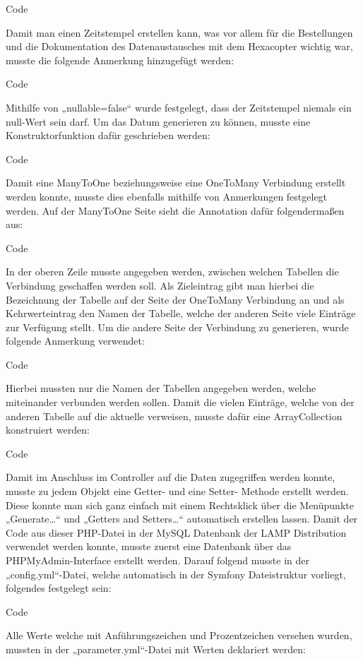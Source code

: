 	Code
	
	Damit man einen Zeitstempel erstellen kann, was vor allem für die Bestellungen und die Dokumentation des Datenaustausches mit dem Hexacopter wichtig war, musste die folgende Anmerkung hinzugefügt werden:
	
	Code
	
	Mithilfe von „nullable=false“ wurde festgelegt, dass der Zeitstempel niemals ein null-Wert sein darf.
	Um das Datum generieren zu können, musste eine Konstruktorfunktion dafür geschrieben werden:
	
	Code
	
	Damit eine ManyToOne beziehungsweise eine OneToMany Verbindung erstellt werden konnte, musste dies ebenfalls mithilfe von Anmerkungen festgelegt werden.
	Auf der ManyToOne Seite sieht die Annotation dafür folgendermaßen aus:
	
	Code
	
	In der oberen Zeile musste angegeben werden, zwischen welchen Tabellen die Verbindung geschaffen werden soll. Als Zieleintrag gibt man hierbei die Bezeichnung der Tabelle auf der Seite der OneToMany Verbindung an und als Kehrwerteintrag den Namen der Tabelle, welche der anderen Seite viele Einträge zur Verfügung stellt.
	Um die andere Seite der Verbindung zu generieren, wurde folgende Anmerkung verwendet:
	
	Code
	
	Hierbei mussten nur die Namen der Tabellen angegeben werden, welche miteinander verbunden werden sollen. Damit die vielen Einträge, welche von der anderen Tabelle auf die aktuelle verweisen, musste dafür eine ArrayCollection konstruiert werden:
	
	Code
	
	Damit im Anschluss im Controller auf die Daten zugegriffen werden konnte, musste zu jedem Objekt eine Getter- und eine Setter- Methode erstellt werden. Diese konnte man sich ganz einfach mit einem Rechtsklick über die Menüpunkte „Generate…“ und „Getters and Setters…“ automatisch erstellen lassen.
	Damit der Code aus dieser PHP-Datei in der MySQL Datenbank der LAMP Distribution verwendet werden konnte, musste zuerst eine Datenbank über das PHPMyAdmin-Interface erstellt werden. Darauf folgend musste in der „config.yml“-Datei, welche automatisch in der Symfony Dateistruktur vorliegt, folgendes festgelegt sein:
	
	Code
	
	Alle Werte welche mit Anführungszeichen und Prozentzeichen versehen wurden, mussten in der „parameter.yml“-Datei mit Werten deklariert werden:
	
